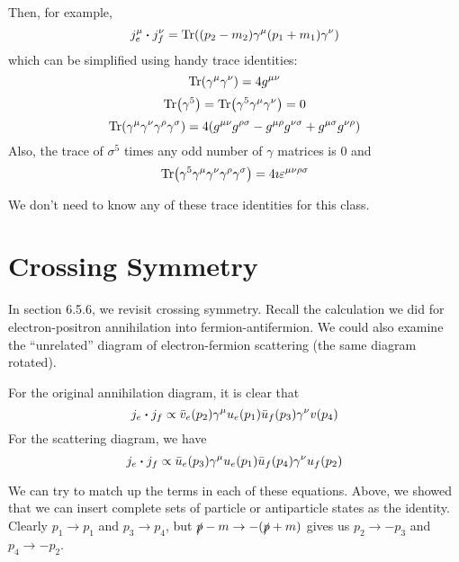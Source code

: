 \documentclass[a4paper,twoside,master.tex]{subfiles}
\begin{document}
Then, for example,
\begin{equation}
    j_e^{\mu} \vdot j_f^{\nu} = \Tr( (p_2 - m_2) \gamma^{\mu} (p_1 + m_1) \gamma^{\nu})
\end{equation}
which can be simplified using handy trace identities:
\begin{equation}
    \Tr(\gamma^{\mu} \gamma^{\nu}) = 4 g^{\mu \nu}
\end{equation}
\begin{equation}
    \Tr(\gamma^5) = \Tr(\gamma^5 \gamma^{\mu} \gamma^{\nu}) = 0
\end{equation}
\begin{equation}
    \Tr(\gamma^{\mu} \gamma^{\nu} \gamma^{\rho} \gamma^{\sigma}) = 4(g^{\mu \nu} g^{\rho \sigma} - g^{\mu \rho} g^{\nu \sigma} + g^{\mu \sigma} g^{\nu \rho})
\end{equation}
Also, the trace of $ \sigma^5 $ times any odd number of $ \gamma $ matrices is $ 0 $ and
\begin{equation}
    \Tr(\gamma^5 \gamma^{\mu} \gamma^{\nu} \gamma^{\rho} \gamma^{\sigma}) = 4 \imath \varepsilon^{\mu \nu \rho \sigma}
\end{equation}

We don't need to know any of these trace identities for this class.

\section{Crossing Symmetry}\label{sec:crossing_symmetry}

In section 6.5.6, we revisit crossing symmetry. Recall the calculation we did for electron-positron annihilation into fermion-antifermion. We could also examine the ``unrelated'' diagram of electron-fermion scattering (the same diagram rotated).

For the original annihilation diagram, it is clear that
\begin{equation}
    j_e \vdot j_f \propto \bar{v}_e(p_2) \gamma^{\mu} u_e(p_1) \bar{u}_f(p_3) \gamma^{\nu} v(p_4)
\end{equation}
For the scattering diagram, we have
\begin{equation}
    j_e \vdot j_f \propto \bar{u}_e(p_3) \gamma^{\mu} u_e(p_1) \bar{u}_f(p_4) \gamma^{\nu} u_f(p_2)
\end{equation}

We can try to match up the terms in each of these equations. Above, we showed that we can insert complete sets of particle or antiparticle states as the identity. Clearly $ p_1 \to p_1 $ and $ p_3 \to p_4 $, but $ \slashed{p} - m \to -(\slashed{p} + m) $ gives us $ p_2 \to - p_3 $ and $ p_4 \to - p_2 $.
\end{document}
